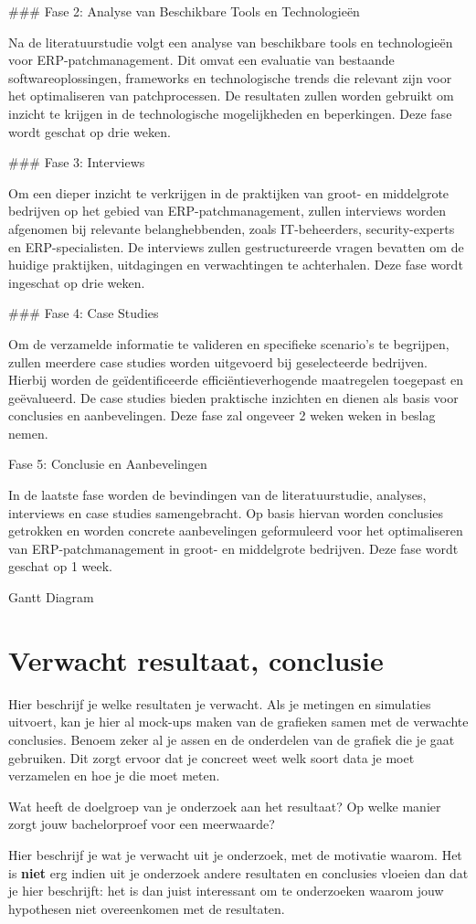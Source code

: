 ### Fase 2: Analyse van Beschikbare Tools en Technologieën

Na de literatuurstudie volgt een analyse van beschikbare tools en technologieën voor ERP-patchmanagement. Dit omvat een evaluatie van bestaande softwareoplossingen, frameworks en technologische trends die relevant zijn voor het optimaliseren van patchprocessen. De resultaten zullen worden gebruikt om inzicht te krijgen in de technologische mogelijkheden en beperkingen. Deze fase wordt geschat op drie weken.

### Fase 3: Interviews

Om een dieper inzicht te verkrijgen in de praktijken van groot- en middelgrote bedrijven op het gebied van ERP-patchmanagement, zullen interviews worden afgenomen bij relevante belanghebbenden, zoals IT-beheerders, security-experts en ERP-specialisten. De interviews zullen gestructureerde vragen bevatten om de huidige praktijken, uitdagingen en verwachtingen te achterhalen. Deze fase wordt ingeschat op drie weken.

### Fase 4: Case Studies

Om de verzamelde informatie te valideren en specifieke scenario's te begrijpen, zullen meerdere case studies worden uitgevoerd bij geselecteerde bedrijven. Hierbij worden de geïdentificeerde efficiëntieverhogende maatregelen toegepast en geëvalueerd. De case studies bieden praktische inzichten en dienen als basis voor conclusies en aanbevelingen. Deze fase zal ongeveer 2 weken weken in beslag nemen.

Fase 5: Conclusie en Aanbevelingen

In de laatste fase worden de bevindingen van de literatuurstudie, analyses, interviews en case studies samengebracht. Op basis hiervan worden conclusies getrokken en worden concrete aanbevelingen geformuleerd voor het optimaliseren van ERP-patchmanagement in groot- en middelgrote bedrijven. Deze fase wordt geschat op 1 week.


Gantt Diagram


\section{Verwacht resultaat, conclusie}%
\label{sec:verwachte_resultaten}

Hier beschrijf je welke resultaten je verwacht. Als je metingen en simulaties uitvoert, kan je hier al mock-ups maken van de grafieken samen met de verwachte conclusies. Benoem zeker al je assen en de onderdelen van de grafiek die je gaat gebruiken. Dit zorgt ervoor dat je concreet weet welk soort data je moet verzamelen en hoe je die moet meten.

Wat heeft de doelgroep van je onderzoek aan het resultaat? Op welke manier zorgt jouw bachelorproef voor een meerwaarde?

Hier beschrijf je wat je verwacht uit je onderzoek, met de motivatie waarom. Het is \textbf{niet} erg indien uit je onderzoek andere resultaten en conclusies vloeien dan dat je hier beschrijft: het is dan juist interessant om te onderzoeken waarom jouw hypothesen niet overeenkomen met de resultaten.


